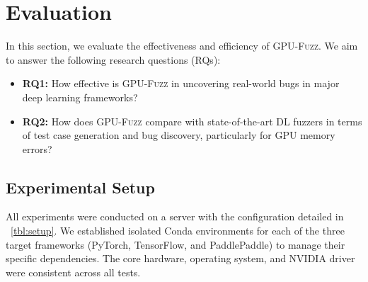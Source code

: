 \section{Evaluation}
\label{sec:eval}

In this section, we evaluate the effectiveness and efficiency of \textsc{GPU-Fuzz}. We aim to answer the following research questions (RQs):
\begin{itemize}[leftmargin=1em]
    \item \textbf{RQ1:} How effective is \textsc{GPU-Fuzz} in uncovering real-world bugs in major deep learning frameworks?
    \item \textbf{RQ2:} How does \textsc{GPU-Fuzz} compare with state-of-the-art DL fuzzers in terms of test case generation and bug discovery, particularly for GPU memory errors?
\end{itemize}

\subsection{Experimental Setup}
\label{sec:setup}
All experiments were conducted on a server with the configuration detailed in \T~\ref{tbl:setup}. We established isolated Conda environments for each of the three target frameworks (PyTorch, TensorFlow, and PaddlePaddle) to manage their specific dependencies. The core hardware, operating system, and NVIDIA driver were consistent across all tests.

